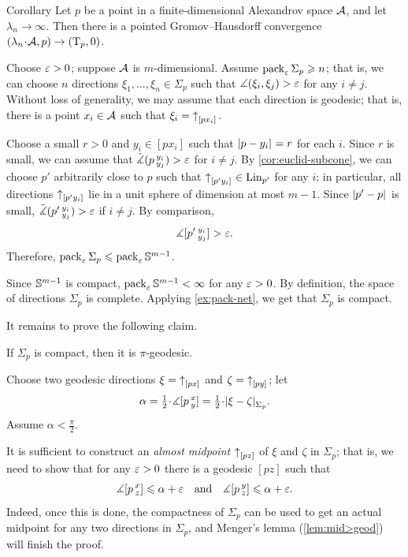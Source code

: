 \begin{thm}{Corollary}\label{ex:GHto-tangent-finite-dim}
Let $p$ be a point in a finite-dimensional Alexandrov space $\mathcal{A}$,
and let $\lambda_n\to\infty$.
Then there is a pointed Gromov--Hausdorff convergence $(\lambda_n\cdot \spc{A},p)\z\to (\T_p,0)$.
\end{thm}

Choose $\varepsilon>0$; suppose $\mathcal{A}$ is $m$-dimensional.
Assume $\operatorname{\rm pack}\nolimits_\varepsilon \Sigma_p\geqslant n$;
that is, we can choose $n$ directions $\xi_1,\dots, \xi_n\in \Sigma_p$ such that $\mangle(\xi_i,\xi_j)\z>\eps$ for any $i\ne j$.
Without loss of generality, we may assume that each direction is geodesic;
that is, there is a point $x_i\in \mathcal{A}$ such that $\xi_i={\uparrow}_{[{p}{x_i}]_{{}}}$.

Choose a small $r>0$ and $y_i\in [px_i]$ such that $\dist{p}{y_i}{}=r$ for each $i$.
Since $r$ is small, we can assume that $\tilde\measuredangle(p\,{}^{y_i}_{y_j})>\varepsilon$ for $i\ne j$.
By \ref{cor:euclid-subcone}, we can choose $p'$ arbitrarily close to $p$ such that ${\uparrow}_{[{p'}{y_i}]_{{}}}\in \mathop{\rm Lin}\nolimits_{p'}$ for any $i$;
in particular, all directions ${\uparrow}_{[{p'}{y_i}]_{{}}}$ lie in a unit sphere of dimension at most $m-1$.
Since $\dist{p'}{p}{}$ is small, $\tilde\measuredangle(p'\,{}^{y_i}_{y_j})>\varepsilon$ if $i\ne j$.
By comparison,
\[\measuredangle [p'\,{}^{y_i}_{y_j}]>\varepsilon.\]
Therefore, $\operatorname{\rm pack}\nolimits_\varepsilon \Sigma_p\leqslant \operatorname{\rm pack}\nolimits_\varepsilon\mathbb{S}^{m-1}$.

Since $\mathbb{S}^{m-1}$ is compact, $\operatorname{\rm pack}\nolimits_\varepsilon\mathbb{S}^{m-1}<\infty$ for any $\varepsilon>0$.
By definition, the space of directions $\Sigma_p$ is complete.
Applying \ref{ex:pack-net}, we get that $\Sigma_p$ is compact.

It remains to prove the following claim.

\begin{clm}{}
If $\Sigma_p$ is compact, then it is $\pi$-geodesic.
\end{clm}

Choose two geodesic directions $\xi={\uparrow}_{[{p}{x}]_{{}}}$ and $\zeta={\uparrow}_{[{p}{y}]_{{}}}$;
let
\[\alpha\z=\tfrac12\cdot \mangle \hinge pxy=\tfrac12\cdot \dist{\xi}{\zeta}{\Sigma_p}.\]
Assume $\alpha<\tfrac\pi2$.

It is sufficient to construct an \emph{almost midpoint} ${\uparrow}_{[{p}{z}]_{{}}}$ of $\xi$ and $\zeta$ in $\Sigma_p$;
that is, we need to show that for any $\varepsilon>0$ there is a geodesic $[pz]$ such that
\[\measuredangle[p\,{}^{x}_{z}]\leqslant \alpha+\varepsilon
\quad\text{and}\quad
\measuredangle[p\,{}^{y}_{z}]\leqslant \alpha+\varepsilon.\]
Indeed, once this is done, the compactness of $\Sigma_p$ can be used to get an actual midpoint for any two directions in $\Sigma_p$, and Menger's lemma (\ref{lem:mid>geod}) will finish the proof.

